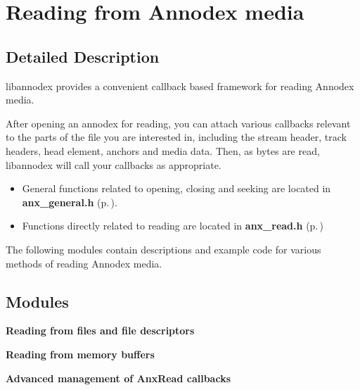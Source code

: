 \section{Reading from Annodex media}
\label{group__reading}


\subsection{Detailed Description}
libannodex provides a convenient callback based framework for reading Annodex media. 

After opening an annodex for reading, you can attach various callbacks relevant to the parts of the file you are interested in, including the stream header, track headers, head element, anchors and media data. Then, as bytes are read, libannodex will call your callbacks as appropriate.

\begin{itemize}
\item General functions related to opening, closing and seeking are located in {\bf anx\_\-general.h }{\rm (p.\,\pageref{anx__general_8h})}.\item Functions directly related to reading are located in {\bf anx\_\-read.h }{\rm (p.\,\pageref{anx__read_8h})}\end{itemize}


The following modules contain descriptions and example code for various methods of reading Annodex media. 

\subsection*{Modules}
\begin{CompactItemize}
\item 
{\bf Reading from files and file descriptors}
\item 
{\bf Reading from memory buffers}
\item 
{\bf Advanced management of Anx\-Read callbacks}
\end{CompactItemize}
